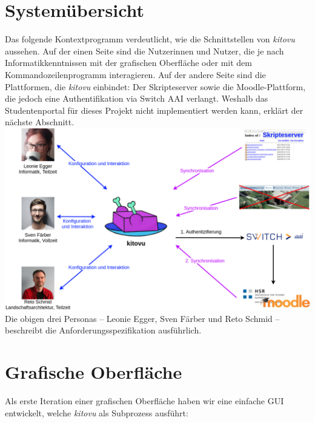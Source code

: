 \documentclass[a4paper]{article}
\let\oldsection\section
\renewcommand\section{\clearpage\oldsection}
\begin{document}
\section{Systemübersicht}

Das folgende Kontextprogramm verdeutlicht, wie die Schnittstellen von \emph{kitovu} aussehen. Auf der einen Seite  sind die Nutzerinnen und Nutzer, die je nach Informatikkenntnissen mit der grafischen Oberfläche oder mit dem Kommandozeilenprogramm interagieren. Auf der andere Seite sind die Plattformen, die \emph{kitovu} einbindet: Der Skripteserver sowie die Moodle-Plattform, die jedoch eine Authentifikation via Switch AAI verlangt. Weshalb das Studentenportal für dieses Projekt nicht implementiert werden kann, erklärt der nächste Abschnitt. \\

\includegraphics[width=40em]{./img/kontextdiagramm.png} \\

Die obigen drei Personas -- Leonie Egger, Sven Färber und Reto Schmid -- beschreibt die Anforderungsspezifikation ausführlich.

\section{Grafische Oberfläche}


Als erste Iteration einer grafischen Oberfläche haben wir eine einfache GUI
entwickelt, welche \emph{kitovu} als Subprozess ausführt:
\end{document}
